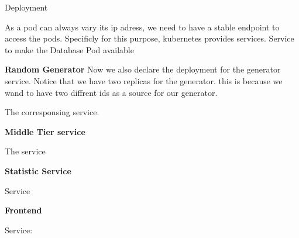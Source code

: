 Deployment


As a pod can always vary its ip adress, we need to have a stable endpoint to access the pods.
Specificly for this purpose, kubernetes provides services.
Service to make the Database Pod available 


\textbf{Random Generator}
Now we also declare the deployment for the generator service.
Notice that we have two replicas for the generator. this is because we wand to have two diffrent ids as a source for our generator.


The corresponsing service.


\textbf{Middle Tier service}

The service


\textbf{Statistic Service}

Service


\textbf{Frontend}


Service:

